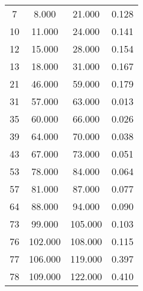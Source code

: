% 
\begin{tabular}{cccc}
  \hline
  \hline
7 & 8.000 & 21.000 & 0.128 \\ 
  10 & 11.000 & 24.000 & 0.141 \\ 
  12 & 15.000 & 28.000 & 0.154 \\ 
  13 & 18.000 & 31.000 & 0.167 \\ 
  21 & 46.000 & 59.000 & 0.179 \\ 
  31 & 57.000 & 63.000 & 0.013 \\ 
  35 & 60.000 & 66.000 & 0.026 \\ 
  39 & 64.000 & 70.000 & 0.038 \\ 
  43 & 67.000 & 73.000 & 0.051 \\ 
  53 & 78.000 & 84.000 & 0.064 \\ 
  57 & 81.000 & 87.000 & 0.077 \\ 
  64 & 88.000 & 94.000 & 0.090 \\ 
  73 & 99.000 & 105.000 & 0.103 \\ 
  76 & 102.000 & 108.000 & 0.115 \\ 
  77 & 106.000 & 119.000 & 0.397 \\ 
  78 & 109.000 & 122.000 & 0.410 \\ 
   \hline
\end{tabular}
